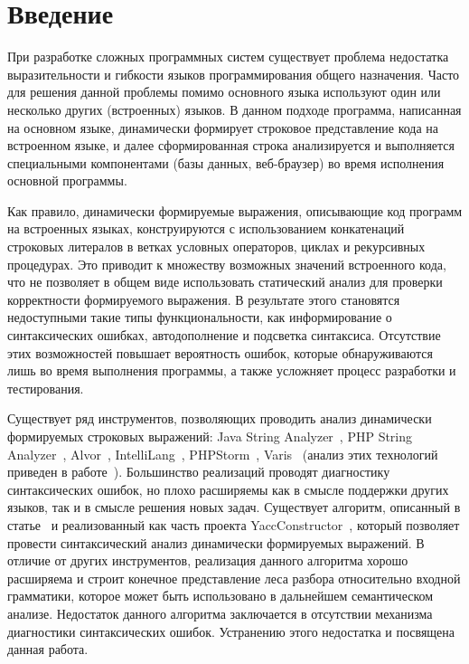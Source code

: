\section*{Введение}

При разработке сложных программных систем существует проблема недостатка выразительности и гибкости языков программирования общего назначения. Часто для решения данной проблемы помимо основного языка используют один или несколько других (встроенных) языков. В данном подходе программа, написанная на основном языке, динамически формирует строковое представление кода на встроенном языке, и далее сформированная строка анализируется и выполняется специальными компонентами (базы данных, веб-браузер) во время исполнения основной программы.

Как правило, динамически формируемые выражения, описывающие код программ на встроенных языках, конструируются с использованием конкатенаций строковых литералов в ветках условных операторов, циклах и рекурсивных процедурах. Это приводит к множеству возможных значений встроенного кода, что не позволяет в общем виде использовать статический анализ для проверки корректности формируемого выражения. В результате этого становятся недоступными такие типы функциональности, как информирование о синтаксических ошибках, автодополнение и подсветка синтаксиса. Отсутствие этих возможностей повышает вероятность ошибок, которые обнаруживаются лишь во время выполнения программы, а также усложняет процесс разработки и тестирования.

Существует ряд инструментов, позволяющих проводить анализ динамически формируемых строковых выражений: Java String Analyzer~\cite{JSA,JSAUrl}, PHP String Analyzer~\cite{PHPSA}, Alvor~\cite{Alvor1, Alvor2, AlvorUrl}, IntelliLang~\cite{IntelliLang}, PHPStorm~\cite{PHPStorm}, Varis~\cite{Varis} (анализ этих технологий приведен в работе~\cite{SemonPHD}). Большинство реализаций проводят диагностику синтаксических ошибок, но плохо расширяемы как в смысле поддержки других языков, так и в смысле решения новых задач. Существует алгоритм, описанный в статье~\cite{ARNGLR} и реализованный как часть проекта YaccConstructor~\cite{YC}, который позволяет провести синтаксический анализ динамически формируемых выражений. В отличие от других инструментов, реализация данного алгоритма хорошо расширяема и строит конечное представление леса разбора относительно входной грамматики, которое может быть использовано в дальнейшем семантическом анализе. Недостаток данного алгоритма заключается в отсутствии механизма диагностики синтаксических ошибок. Устранению этого недостатка и посвящена данная работа.

